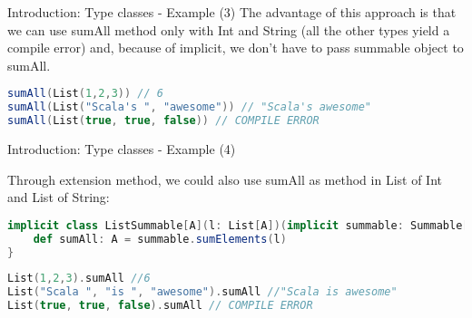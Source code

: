 \begin{frame}[fragile]{Introduction: Type classes - Example (3)}
	The advantage of this approach is that we can use sumAll method only with Int and String (all the other types yield
	a compile error) and, because of implicit, we don't have to pass summable object to sumAll.
	
\begin{lstlisting}[language=scala]
sumAll(List(1,2,3)) // 6
sumAll(List("Scala's ", "awesome")) // "Scala's awesome"
sumAll(List(true, true, false)) // COMPILE ERROR				
\end{lstlisting}

\end{frame}
	
\begin{frame}[fragile]{Introduction: Type classes - Example (4)}
	
	Through extension method, we could also use sumAll as method in List of Int and List of String:
\begin{lstlisting}[language=scala]
implicit class ListSummable[A](l: List[A])(implicit summable: Summable[A]) {
	def sumAll: A = summable.sumElements(l)
}
\end{lstlisting}	
	
	\pause
	
\begin{lstlisting}[language=scala]
List(1,2,3).sumAll //6
List("Scala ", "is ", "awesome").sumAll //"Scala is awesome"
List(true, true, false).sumAll // COMPILE ERROR
\end{lstlisting}
\end{frame}